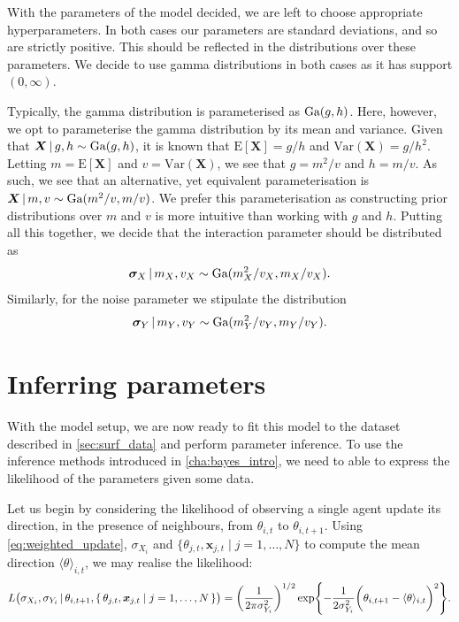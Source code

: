 With the parameters of the model decided, we are left to choose appropriate hyperparameters. In both 
cases our parameters are standard deviations, and so are strictly positive. This should be reflected 
in the distributions over these parameters. We decide to use gamma distributions in both cases as it 
has support $(0, \infty)$.

Typically, the gamma distribution is parameterised as $\textrm{Ga}(g, h)$. Here, however, we opt to 
parameterise the gamma distribution by its mean and variance. Given that $\bm{X} \,|\, g, h \sim 
\textrm{Ga}(g, h)$, it is known that $\textrm{E}[\bm{X}] = g / h$ and $\textrm{Var}(\bm{X}) = g/h^2$. Letting 
$m = \textrm{E}[\bm{X}]$ and $v =\textrm{Var}(\bm{X})$, we see that $g = m^2 / v$ and $h = m / v$. As 
such, we see that an alternative, yet equivalent parameterisation is $\bm{X} \,|\, m, v \sim \textrm{Ga}(m^2 
/ v, m / v)$. We prefer this parameterisation as constructing prior distributions over $m$ and $v$ is 
more intuitive than working with $g$ and $h$. Putting all this together, we decide that the 
interaction parameter should be distributed as
\begin{equation}
	\label{eq:x_hypers}
	\bm{\sigma}_X \,|\, m_X, v_X \sim \textrm{Ga}(m_X^2 / v_X, m_X / v_X).
\end{equation}
Similarly, for the noise parameter we stipulate the distribution
\begin{equation}
	\label{eq:y_hypers}
	\bm{\sigma}_Y \,|\, m_Y, v_Y \sim \textrm{Ga}(m_Y^2 / v_Y, m_Y / v_Y).
\end{equation}

\section{Inferring parameters}
\label{sec:vicsek_infer}

With the model setup, we are now ready to fit this model to the dataset described in 
\cref{sec:surf_data} and perform parameter inference. To use the inference methods introduced in 
\cref{cha:bayes_intro}, we need to able to express the likelihood of the parameters given some data. 

Let us begin by considering the likelihood of observing a single agent update its direction, in the 
presence of neighbours, from $\theta_{i, t}$ to $\theta_{i, t+1}$. Using \cref{eq:weighted_update}, 
$\sigma_{X_i}$ and $\{\theta_{j, t}, \bm{x}_{j, t} \mid j=1,\ldots,N\}$ to compute the mean direction 
$\langle \theta \rangle_{i, t}$, we may realise the likelihood:
\begin{equation}
\label{eq:simple_likelihood}
	L\big(\sigma_{X_i}, \sigma_{Y_i} \,|\, \theta_{i, t+1},  \{\,\theta_{j, t}, \bm{x}_{j, t} \mid 
j=1,\ldots,N\,\}\big) = \bigg( \frac{1}{2\pi\sigma_{Y_i}^2} \bigg)^{1/2} 
\exp{-\frac{1}{2\sigma_{Y_i}^2} \bigg(\theta_{i, t+1} - \langle \theta \rangle_{i, t}\bigg)^2 }.
\end{equation}

